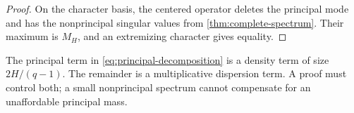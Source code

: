 \begin{proof}
On the character basis, the centered operator deletes the principal
mode and has the nonprincipal singular values from
\cref{thm:complete-spectrum}.  Their maximum is \(M_H\), and an
extremizing character gives equality.
\end{proof}

\begin{remark}
The principal term in \eqref{eq:principal-decomposition} is a density
term of size \(2H/(q-1)\).  The remainder is a multiplicative
dispersion term.  A proof must control both; a small nonprincipal
spectrum cannot compensate for an unaffordable principal mass.
\end{remark}
